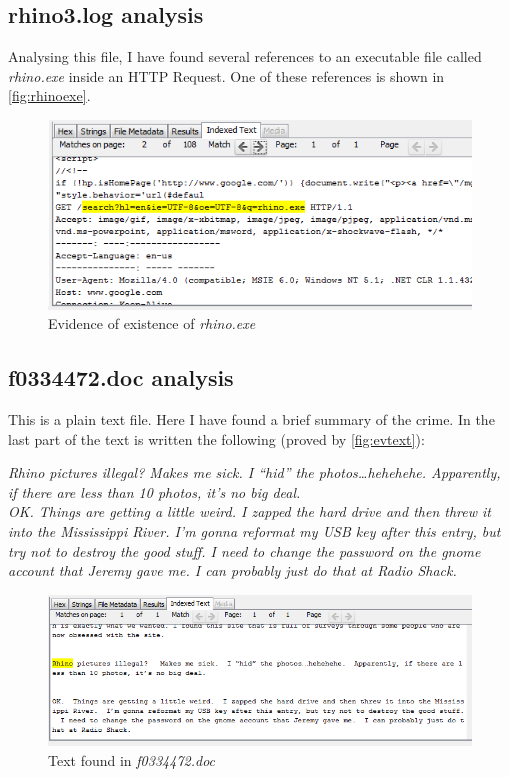 \documentclass{article}
\begin{document}
\subsection{rhino3.log analysis}
Analysing this file, I have found several references to an executable file called \textit{rhino.exe} inside an HTTP Request. One of these references is shown in \autoref{fig:rhinoexe}.

\begin{figure}[h]
	\includegraphics[width=\textwidth]{img/rhinoexe.png}
	\caption{Evidence of existence of \textit{rhino.exe}}
	\label{fig:rhinoexe}
\end{figure}

\subsection{f0334472.doc analysis}
This is a plain text file. Here I have found a brief summary of the crime. In the last part of the text is written the following (proved by \autoref{fig:evtext}):

\vspace{0.5cm}
\parbox{0.8\textwidth}{
	\normalsize
	\textit{Rhino pictures illegal?   Makes me sick.  I “hid” the photos…hehehehe.  Apparently, if there are less than 10 photos, it’s no big deal.\\
	OK.  Things are getting a little weird.  I zapped the hard drive and then threw it into the Mississippi River.  I’m gonna reformat my USB key after this entry, but try not to destroy the good stuff.  I need to change the password on the gnome account that Jeremy gave me.  I can probably just do that at Radio Shack.
	}
}
\vspace{0.5cm}

\begin{figure}[h]
	\includegraphics[width=\textwidth]{img/evtext.png}
	\caption{Text found in \textit{f0334472.doc}}
	\label{fig:evtext}
\end{figure}
\end{document}
